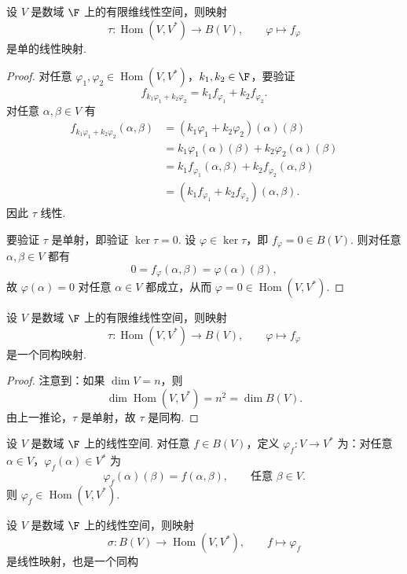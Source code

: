 \begin{corollary}
	设 $V$ 是数域 $\F$ 上的有限维线性空间，则映射
	\[
	\tau:\operatorname{Hom}(V,V^*)\longrightarrow B(V),\qquad \varphi\longmapsto f_\varphi
	\]
	是单的线性映射.
\end{corollary}
\begin{proof}
	对任意 $\varphi_1,\varphi_2\in\operatorname{Hom}(V,V^*)$，$k_1,k_2\in\F$，要验证
	\[
	f_{k_1\varphi_1+k_2\varphi_2}=k_1f_{\varphi_1}+k_2f_{\varphi_2}.
	\]
	对任意 $\alpha,\beta\in V$ 有
	\[
	\begin{aligned}
		f_{k_1\varphi_1+k_2\varphi_2}(\alpha,\beta)
		&=(k_1\varphi_1+k_2\varphi_2)(\alpha)(\beta)\\
		&=k_1\varphi_1(\alpha)(\beta)+k_2\varphi_2(\alpha)(\beta)\\
		&=k_1f_{\varphi_1}(\alpha,\beta)+k_2f_{\varphi_2}(\alpha,\beta)\\
		&=(k_1f_{\varphi_1}+k_2f_{\varphi_2})(\alpha,\beta).
	\end{aligned}
	\]
	因此 $\tau$ 线性.
	
	要验证 $\tau$ 是单射，即验证 $\ker\tau=0$. 设 $\varphi\in\ker\tau$，即 $f_\varphi=0\in B(V)$. 则对任意 $\alpha,\beta\in V$ 都有
	\[
	0=f_\varphi(\alpha,\beta)=\varphi(\alpha)(\beta),
	\]
	故 $\varphi(\alpha)=0$ 对任意 $\alpha\in V$ 都成立，从而 $\varphi=0\in\operatorname{Hom}(V,V^*)$.
\end{proof}
\begin{corollary}
	设 $V$ 是数域 $\F$ 上的有限维线性空间，则映射
	\[
	\tau:\operatorname{Hom}(V,V^*)\longrightarrow B(V),\qquad \varphi\longmapsto f_\varphi
	\]
	是一个同构映射.
\end{corollary}
\begin{proof}
	注意到：如果 $\dim V=n$，则
	\[
	\dim\operatorname{Hom}(V,V^*)=n^2=\dim B(V).
	\]
	由上一推论，$\tau$ 是单射，故 $\tau$ 是同构.
\end{proof}
\begin{lemma}
	设 $V$ 是数域 $\F$ 上的线性空间. 对任意 $f\in B(V)$，定义 $\varphi_f:V\to V^*$ 为：对任意 $\alpha\in V$，$\varphi_f(\alpha)\in V^*$ 为
	\[
	\varphi_f(\alpha)(\beta)=f(\alpha,\beta),\qquad \text{任意 }\beta\in V.
	\]
	则 $\varphi_f\in\operatorname{Hom}(V,V^*)$.
\end{lemma}

\begin{corollary}
	设 $V$ 是数域 $\F$ 上的线性空间，则映射
	\[
	\sigma:B(V)\longrightarrow \operatorname{Hom}(V,V^*),\qquad f\longmapsto \varphi_f
	\]
	是线性映射，也是一个同构
\end{corollary}

